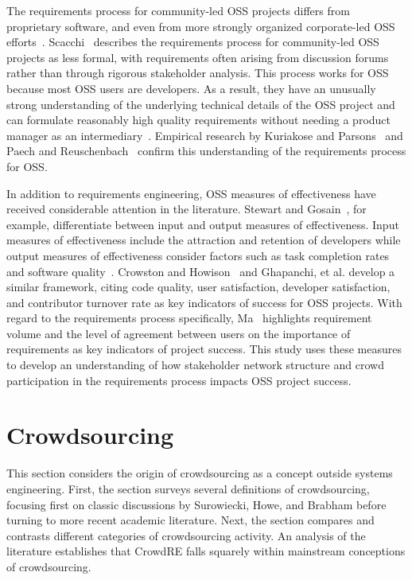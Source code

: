 The requirements process for community-led OSS projects differs from proprietary software, and even from more strongly organized corporate-led OSS efforts~\cite{scacchi}. Scacchi~\cite{scacchi} describes the requirements process for community-led OSS projects as less formal, with requirements often arising from discussion forums rather than through rigorous stakeholder analysis. This process works for OSS because most OSS users are developers. As a result, they have an unusually strong understanding of the underlying technical details of the OSS project and can formulate reasonably high quality requirements without needing a product manager as an intermediary~\cite{scacchi}. Empirical research by Kuriakose and Parsons~\cite{kuriakose} and Paech and Reuschenbach~\cite{paech} confirm this understanding of the requirements process for OSS.

In addition to requirements engineering, OSS measures of effectiveness have received considerable attention in the literature. Stewart and Gosain~\cite{stewart}, for example, differentiate between input and output measures of effectiveness. Input measures of effectiveness include the attraction and retention of developers while output measures of effectiveness consider factors such as task completion rates and software quality~\cite{stewart}. Crowston and Howison~\cite{crowston} and Ghapanchi, et al. \cite{ghapanchi} develop a similar framework, citing code quality, user satisfaction, developer satisfaction, and contributor turnover rate as key indicators of success for OSS projects. With regard to the requirements process specifically, Ma~\cite{ma} highlights requirement volume and the level of agreement between users on the importance of requirements as key indicators of project success. This study uses these measures to develop an understanding of how stakeholder network structure and crowd participation in the requirements process impacts OSS project success.

\section{Crowdsourcing}

This section considers the origin of crowdsourcing as a concept outside systems engineering. First, the section surveys several definitions of crowdsourcing, focusing first on classic discussions by Surowiecki, Howe, and Brabham before turning to more recent academic literature. Next, the section compares and contrasts different categories of crowdsourcing activity. An analysis of the literature establishes that CrowdRE falls squarely within mainstream conceptions of crowdsourcing.   

